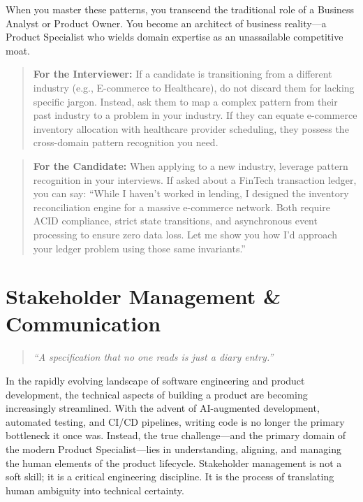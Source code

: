 When you master these patterns, you transcend the traditional role of a
Business Analyst or Product Owner. You become an architect of business
reality---a Product Specialist who wields domain expertise as an
unassailable competitive moat.

\begin{quote}
\textbf{For the Interviewer:} If a candidate is transitioning from a
different industry (e.g., E-commerce to Healthcare), do not discard them
for lacking specific jargon. Instead, ask them to map a complex pattern
from their past industry to a problem in your industry. If they can
equate e-commerce inventory allocation with healthcare provider
scheduling, they possess the cross-domain pattern recognition you need.
\end{quote}

\begin{quote}
\textbf{For the Candidate:} When applying to a new industry, leverage
pattern recognition in your interviews. If asked about a FinTech
transaction ledger, you can say: ``While I haven't worked in lending, I
designed the inventory reconciliation engine for a massive e-commerce
network. Both require ACID compliance, strict state transitions, and
asynchronous event processing to ensure zero data loss. Let me show you
how I'd approach your ledger problem using those same invariants.''
\end{quote}

\chapter{Stakeholder Management \&
Communication}\label{stakeholder-management-communication}

\begin{quote}
\emph{``A specification that no one reads is just a diary entry.''}
\end{quote}

In the rapidly evolving landscape of software engineering and product
development, the technical aspects of building a product are becoming
increasingly streamlined. With the advent of AI-augmented development,
automated testing, and CI/CD pipelines, writing code is no longer the
primary bottleneck it once was. Instead, the true challenge---and the
primary domain of the modern Product Specialist---lies in understanding,
aligning, and managing the human elements of the product lifecycle.
Stakeholder management is not a soft skill; it is a critical engineering
discipline. It is the process of translating human ambiguity into
technical certainty.

